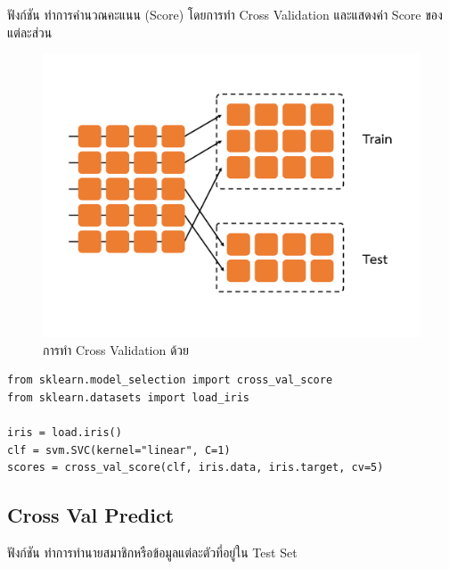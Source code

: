 ฟังก์ชัน  ทำการคำนวณคะแนน (Score) โดยการทำ Cross Validation และแสดงค่า Score ของแต่ละส่วน

\begin{figure}[H]
    \centering
    \includegraphics[width=0.9\linewidth,page=2]{fig/cross_validation.pdf}
    \caption{การทำ Cross Validation ด้วย }
    \label{fig:cross_val_score}
\end{figure}

\begin{lstlisting}[style=MyPython]
from sklearn.model_selection import cross_val_score
from sklearn.datasets import load_iris

iris = load.iris()
clf = svm.SVC(kernel="linear", C=1)
scores = cross_val_score(clf, iris.data, iris.target, cv=5)
\end{lstlisting}

\subsection{Cross Val Predict}
\label{ssec:cross_val_predict}

ฟังก์ชัน  ทำการทำนายสมาชิกหรือข้อมูลแต่ละตัวที่อยู่ใน Test Set

